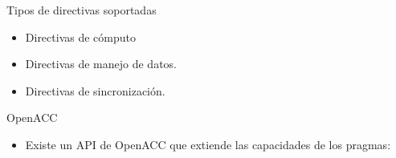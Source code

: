 \documentclass[aspectratio=169]{beamer}
\begin{document}
\begin{frame}{Tipos de directivas soportadas}
    \begin{itemize}
        \item Directivas de cómputo
        \item Directivas de manejo de datos.
        \item Directivas de sincronización.
    \end{itemize}
\end{frame}

\begin{frame}{OpenACC}
    \begin{itemize}
        \item Existe un API de OpenACC que extiende las capacidades de los pragmas:
    \end{itemize}

    \begin{figure}
        \centering
    \end{figure}
\end{frame}
\end{document}
